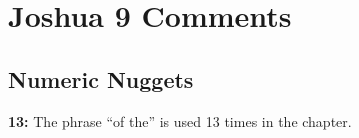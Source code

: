 \section{Joshua 9 Comments}

\subsection{Numeric Nuggets}
\textbf{13: } The phrase ``of the'' is used 13 times in the chapter.

